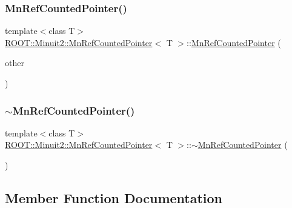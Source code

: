 \subsubsection{\texorpdfstring{MnRefCountedPointer()}{MnRefCountedPointer()}\hspace{0.1cm}{\footnotesize\ttfamily [9/9]}}
{\footnotesize\ttfamily template$<$class T$>$ \\
\mbox{\hyperlink{classROOT_1_1Minuit2_1_1MnRefCountedPointer}{R\+O\+O\+T\+::\+Minuit2\+::\+Mn\+Ref\+Counted\+Pointer}}$<$ T $>$\+::\mbox{\hyperlink{classROOT_1_1Minuit2_1_1MnRefCountedPointer}{Mn\+Ref\+Counted\+Pointer}} (\begin{DoxyParamCaption}\item[{const \mbox{\hyperlink{classROOT_1_1Minuit2_1_1MnRefCountedPointer}{Mn\+Ref\+Counted\+Pointer}}$<$ T $>$ \&}]{other }\end{DoxyParamCaption})\hspace{0.3cm}{\ttfamily [inline]}}

\mbox{\label{classROOT_1_1Minuit2_1_1MnRefCountedPointer_ae3bdd5d92c9c44bd3490954bca60fd47}} 
\subsubsection{\texorpdfstring{$\sim$MnRefCountedPointer()}{~MnRefCountedPointer()}\hspace{0.1cm}{\footnotesize\ttfamily [3/3]}}
{\footnotesize\ttfamily template$<$class T$>$ \\
\mbox{\hyperlink{classROOT_1_1Minuit2_1_1MnRefCountedPointer}{R\+O\+O\+T\+::\+Minuit2\+::\+Mn\+Ref\+Counted\+Pointer}}$<$ T $>$\+::$\sim$\mbox{\hyperlink{classROOT_1_1Minuit2_1_1MnRefCountedPointer}{Mn\+Ref\+Counted\+Pointer}} (\begin{DoxyParamCaption}{ }\end{DoxyParamCaption})\hspace{0.3cm}{\ttfamily [inline]}}



\subsection{Member Function Documentation}
\mbox{\label{classROOT_1_1Minuit2_1_1MnRefCountedPointer_a9a8d01a9009e9a9b272c14e46cbeb4d5}} 
